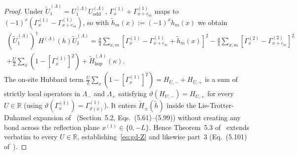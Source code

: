 \documentclass[11pt]{article}
\theoremstyle{definition}
\theoremstyle{remark}
\newcommand{\bbR}{\mathbb{R}}
\begin{document}
\begin{proof}
Under $\tilde{U}_1^{(\Lambda)} = U_1^{(\Lambda)} U_{\mathrm{odd}}^{(\Lambda)}$, $\Gamma_x^{(1)} + \Gamma_{x+e_m}^{(1)}$ maps to $(-1)^x(\Gamma_x^{(1)} - \Gamma_{x+e_m}^{(1)})$, so with $\tilde{h}_m(x) := (-1)^x h_m(x)$ we obtain
\begin{multline}\label{eq:H-deformed-tilde}
(\tilde{U}_1^{(\Lambda)})^\dagger H^{(\Lambda)}(h) \tilde{U}_1^{(\Lambda)} = \frac{g}{4} \sum_{x,m} \left[\Gamma_x^{(1)} - \Gamma_{x+e_m}^{(1)} + \tilde{h}_m(x)\right]^2 - \frac{g}{4} \sum_{x,m} \left[\Gamma_x^{(2)} - \Gamma_{x+e_m}^{(2)}\right]^2 \\
+ \frac{U}{2} \sum_x \left(1 - [\Gamma_x^{(1)}]^2\right) + \tilde{H}_{\mathrm{hop}}^{(\Lambda)}(\kappa).
\end{multline}
The on-site Hubbard term $\frac{U}{2}\sum_x (1 - [\Gamma_x^{(1)}]^2) = H_{U,-} + H_{U,+}$ is a sum of strictly local operators in $\Lambda_-$ and $\Lambda_+$ satisfying $\vartheta(H_{U,-}) = H_{U,+}$ for every $U \in \bbR$ (using $\vartheta(\Gamma_x^{(1)}) = \Gamma_{\vartheta(x)}^{(1)}$). It enters $\tilde{H}_\pm(\tilde{h})$ inside the Lie-Trotter-Duhamel expansion of~\cite{koma2022} (Section~5.2, Eqs.~(5.61)--(5.99)) without creating any bond across the reflection plane $x^{(1)} \in \{0, -L\}$. Hence Theorem~5.3 of~\cite{koma2022} extends verbatim to every $U \in \bbR$, establishing~\eqref{eq:gd-Z} and likewise part~3 (Eq.~(5.101) of~\cite{koma2022}).


\end{proof}
\end{document}
